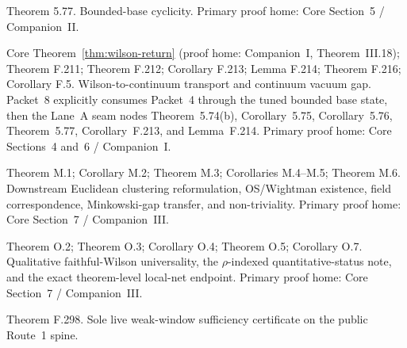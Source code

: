 \begin{description}[leftmargin=2.2em,style=nextline]
\item[Packet 7.] Theorem 5.77. Bounded-base cyclicity. Primary proof home: Core Section~5 / Companion~II.
\item[Packet 8.] Core Theorem~\ref{thm:wilson-return} (proof home: Companion~I, Theorem~III.18); Theorem F.211; Theorem F.212; Corollary F.213; Lemma F.214; Theorem F.216; Corollary F.5. Wilson-to-continuum transport and continuum vacuum gap. Packet~8 explicitly consumes Packet~4 through the tuned bounded base state, then the Lane~A seam nodes Theorem~5.74(b), Corollary~5.75, Corollary~5.76, Theorem~5.77, Corollary~F.213, and Lemma~F.214. Primary proof home: Core Sections~4 and~6 / Companion~I.
\item[Packet 9.] Theorem M.1; Corollary M.2; Theorem M.3; Corollaries M.4--M.5; Theorem M.6. Downstream Euclidean clustering reformulation, OS/Wightman existence, field correspondence, Minkowski-gap transfer, and non-triviality. Primary proof home: Core Section~7 / Companion~III.
\item[Packet 10.] Theorem O.2; Theorem O.3; Corollary O.4; Theorem O.5; Corollary O.7. Qualitative faithful-Wilson universality, the $\rho$-indexed quantitative-status note, and the exact theorem-level local-net endpoint. Primary proof home: Core Section~7 / Companion~III.
\item[Auxiliary certification node.] Theorem F.298. Sole live weak-window sufficiency certificate on the public Route~1 spine.
\end{description}

